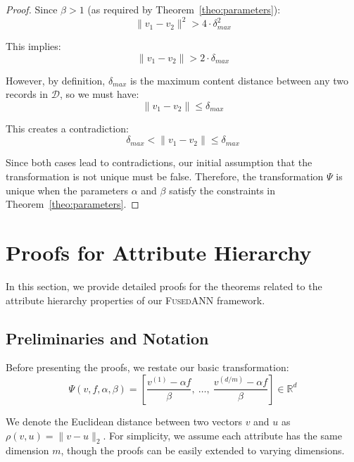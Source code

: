 \documentclass[numbers,sort]{article}
\begin{document}
\begin{proof}
Since $\beta > 1$ (as required by Theorem~\ref{theo:parameters}):
\begin{equation}
\|v_1 - v_2\|^2 > 4 \cdot \delta_{max}^2
\end{equation}

This implies:
\begin{equation}
\|v_1 - v_2\| > 2 \cdot \delta_{max}
\end{equation}

However, by definition, $\delta_{max}$ is the maximum content distance between any two records in $\mathcal{D}$, so we must have:
\begin{equation}
\|v_1 - v_2\| \leq \delta_{max}
\end{equation}

This creates a contradiction:
\begin{equation}
\delta_{max} < \|v_1 - v_2\| \leq \delta_{max}
\end{equation}

Since both cases lead to contradictions, our initial assumption that the transformation is not unique must be false. Therefore, the transformation $\Psi$ is unique when the parameters $\alpha$ and $\beta$ satisfy the constraints in Theorem~\ref{theo:parameters}.
\end{proof}



\section{Proofs for Attribute Hierarchy}
\label{sec:supp-attr-hierarchy}

In this section, we provide detailed proofs for the theorems related to the attribute hierarchy properties of our \textsc{FusedANN} framework.

\subsection{Preliminaries and Notation}
Before presenting the proofs, we restate our basic transformation:
\begin{equation}
\Psi(v, f, \alpha, \beta) = \left[\frac{v^{(1)} - \alpha f}{\beta},~\ldots,~\frac{v^{(d/m)} - \alpha f}{\beta}\right] \in \mathbb{R}^d
\end{equation}

We denote the Euclidean distance between two vectors $v$ and $u$ as $\rho(v, u) = \|v - u\|_2$. For simplicity, we assume each attribute has the same dimension $m$, though the proofs can be easily extended to varying dimensions.
\end{document}

